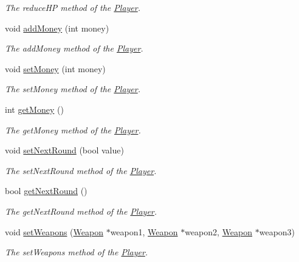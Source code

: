 \begin{DoxyCompactItemize}
\begin{DoxyCompactList}\small\item\em The reduce\+H\+P method of the \hyperlink{class_player}{Player}. \end{DoxyCompactList}\item 
void \hyperlink{class_player_a0f592e3e7e589f40dc5144d1d58283f2}{add\+Money} (int money)
\begin{DoxyCompactList}\small\item\em The add\+Money method of the \hyperlink{class_player}{Player}. \end{DoxyCompactList}\item 
void \hyperlink{class_player_a6e78f6a0e2e73323bf200a9e1c2e0ac6}{set\+Money} (int money)
\begin{DoxyCompactList}\small\item\em The set\+Money method of the \hyperlink{class_player}{Player}. \end{DoxyCompactList}\item 
int \hyperlink{class_player_ac45154df7c4eb2d1d58255c3ff1c55dd}{get\+Money} ()
\begin{DoxyCompactList}\small\item\em The get\+Money method of the \hyperlink{class_player}{Player}. \end{DoxyCompactList}\item 
void \hyperlink{class_player_a7429c38bfd16ded1b2a11af1b0673ba3}{set\+Next\+Round} (bool value)
\begin{DoxyCompactList}\small\item\em The set\+Next\+Round method of the \hyperlink{class_player}{Player}. \end{DoxyCompactList}\item 
bool \hyperlink{class_player_ad0c154bef16fa0c1c3e4c6efb124d420}{get\+Next\+Round} ()
\begin{DoxyCompactList}\small\item\em The get\+Next\+Round method of the \hyperlink{class_player}{Player}. \end{DoxyCompactList}\item 
void \hyperlink{class_player_a0fca3ee9cea38e8944663f19a0cdb27b}{set\+Weapons} (\hyperlink{class_weapon}{Weapon} $\ast$weapon1, \hyperlink{class_weapon}{Weapon} $\ast$weapon2, \hyperlink{class_weapon}{Weapon} $\ast$weapon3)
\begin{DoxyCompactList}\small\item\em The set\+Weapons method of the \hyperlink{class_player}{Player}. \end{DoxyCompactList}\item 

\end{DoxyCompactItemize}

